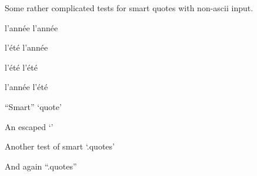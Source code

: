 
\def\mytitle{SmartQuotes Test}

Some rather complicated tests for smart quotes with non-ascii input.

l'année l'année

l'été l'année

l'été l'été

l'année l'été

``Smart'' `quote'

An escaped `\textbar{}'

Another test of smart `.quotes'

And again ``.quotes''




